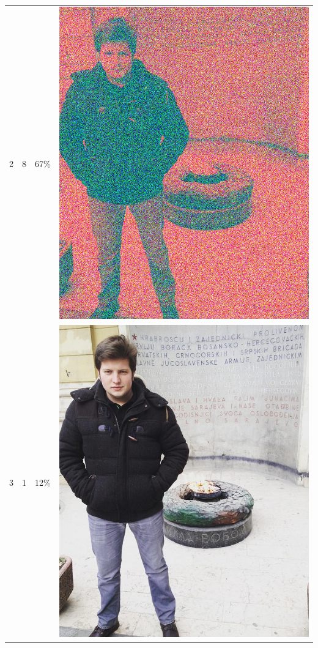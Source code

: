\documentclass[times, utf8, seminar, numeric]{fer}
\begin{document}
\begin{center}
\begin{longtable}{|c|c|c|c|}
2 & 8 &67\% & \includegraphics[scale=0.3]{../benchmark_results/pattern/2_components-8_bits.png} \\
3 & 1 &12\% & \includegraphics[scale=0.3]{../benchmark_results/pattern/3_components-1_bits.png} \\

\end{longtable}
\end{center}
\end{document}

